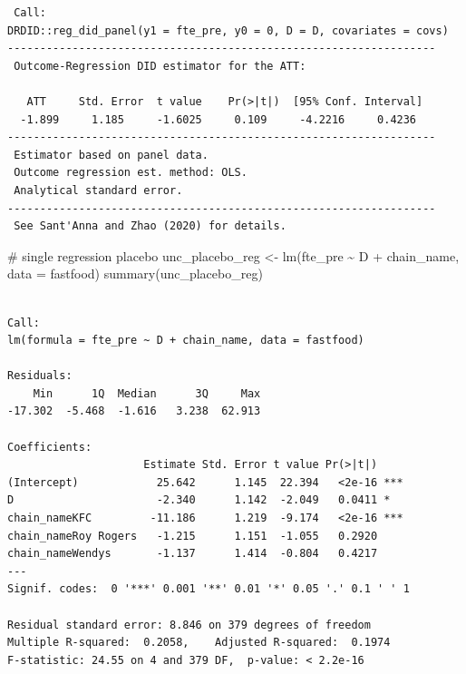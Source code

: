 \documentclass[
  letterpaper,
  DIV=11,
  numbers=noendperiod]{scrreprt}
\newenvironment{Shaded}{\begin{snugshade}}{\end{snugshade}}
\newcommand{\AttributeTok}[1]{\textcolor[rgb]{0.40,0.45,0.13}{#1}}
\newcommand{\CommentTok}[1]{\textcolor[rgb]{0.37,0.37,0.37}{#1}}
\newcommand{\DecValTok}[1]{\textcolor[rgb]{0.68,0.00,0.00}{#1}}
\newcommand{\FunctionTok}[1]{\textcolor[rgb]{0.28,0.35,0.67}{#1}}
\newcommand{\NormalTok}[1]{\textcolor[rgb]{0.00,0.23,0.31}{#1}}
\newcommand{\OtherTok}[1]{\textcolor[rgb]{0.00,0.23,0.31}{#1}}
\newcommand{\SpecialCharTok}[1]{\textcolor[rgb]{0.37,0.37,0.37}{#1}}
\begin{document}
\begin{Shaded}
\end{Shaded}

\begin{verbatim}
 Call:
DRDID::reg_did_panel(y1 = fte_pre, y0 = 0, D = D, covariates = covs)
------------------------------------------------------------------
 Outcome-Regression DID estimator for the ATT:
 
   ATT     Std. Error  t value    Pr(>|t|)  [95% Conf. Interval] 
  -1.899     1.185     -1.6025     0.109     -4.2216     0.4236  
------------------------------------------------------------------
 Estimator based on panel data.
 Outcome regression est. method: OLS.
 Analytical standard error.
------------------------------------------------------------------
 See Sant'Anna and Zhao (2020) for details.
\end{verbatim}

\begin{Shaded}
\begin{Highlighting}[]
\CommentTok{\# single regression placebo}
\NormalTok{unc\_placebo\_reg }\OtherTok{\textless{}{-}} \FunctionTok{lm}\NormalTok{(fte\_pre }\SpecialCharTok{\textasciitilde{}}\NormalTok{ D }\SpecialCharTok{+}\NormalTok{ chain\_name, }\AttributeTok{data =}\NormalTok{ fastfood)}
\FunctionTok{summary}\NormalTok{(unc\_placebo\_reg)}
\end{Highlighting}
\end{Shaded}

\begin{verbatim}

Call:
lm(formula = fte_pre ~ D + chain_name, data = fastfood)

Residuals:
    Min      1Q  Median      3Q     Max 
-17.302  -5.468  -1.616   3.238  62.913 

Coefficients:
                     Estimate Std. Error t value Pr(>|t|)    
(Intercept)            25.642      1.145  22.394   <2e-16 ***
D                      -2.340      1.142  -2.049   0.0411 *  
chain_nameKFC         -11.186      1.219  -9.174   <2e-16 ***
chain_nameRoy Rogers   -1.215      1.151  -1.055   0.2920    
chain_nameWendys       -1.137      1.414  -0.804   0.4217    
---
Signif. codes:  0 '***' 0.001 '**' 0.01 '*' 0.05 '.' 0.1 ' ' 1

Residual standard error: 8.846 on 379 degrees of freedom
Multiple R-squared:  0.2058,    Adjusted R-squared:  0.1974 
F-statistic: 24.55 on 4 and 379 DF,  p-value: < 2.2e-16
\end{verbatim}
\end{document}
